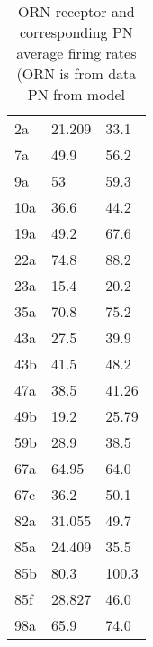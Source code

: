 \begin{table}
    \begin{tabular}{l | l | l}
     2a & 21.209 & 33.1\\
    7a  & 49.9 & 56.2 \\
    9a  & 53 &  59.3   \\
    10a & 36.6 & 44.2  \\
    19a & 49.2 & 67.6  \\
    22a & 74.8 & 88.2  \\
    23a & 15.4 & 20.2  \\
    35a & 70.8 & 75.2  \\
    43a & 27.5 & 39.9  \\
    43b & 41.5 & 48.2  \\
    47a & 38.5 & 41.26  \\
    49b & 19.2 & 25.79  \\
    59b & 28.9 & 38.5  \\
    67a & 64.95 & 64.0 \\
    67c & 36.2 &  50.1 \\
    82a & 31.055 & 49.7 \\
    85a & 24.409 & 35.5 \\
    85b & 80.3 & 100.3  \\
    85f & 28.827 & 46.0  \\
    98a & 65.9 & 74.0  \\
    \end{tabular}
    \caption{ ORN receptor and corresponding PN average firing rates (ORN is from data PN from model }
\end{table}
  
  
  
  